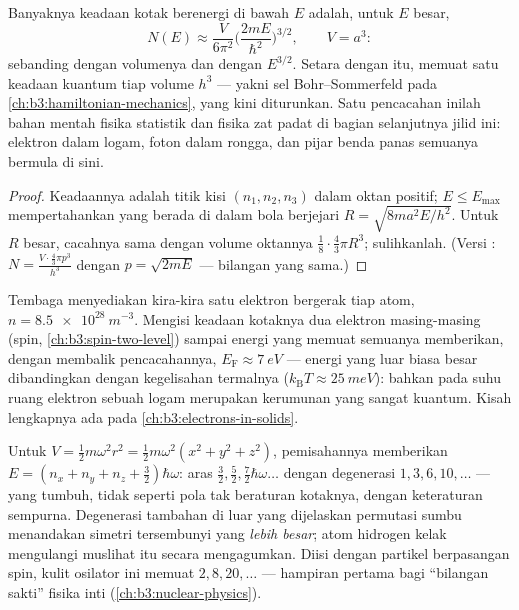 \begin{proposition}\label{prop:b3:schrodinger-three-dimensions:counting}
Banyaknya keadaan kotak berenergi di bawah $E$ adalah, untuk $E$ besar,
\[
N(E) \approx \frac{V}{6\pi^2}\Big(\frac{2mE}{\hbar^2}\Big)^{3/2} ,
\qquad V = a^3 :
\]
sebanding dengan volumenya dan dengan $E^{3/2}$. Setara dengan itu,
 memuat satu keadaan kuantum tiap volume $h^3$ --- yakni sel
Bohr--Sommerfeld pada
\cref{ch:b3:hamiltonian-mechanics}, yang kini diturunkan. Satu
pencacahan inilah bahan mentah fisika statistik dan fisika zat padat di
bagian selanjutnya jilid ini: elektron dalam logam, foton dalam rongga,
dan pijar benda panas semuanya bermula di sini.
\end{proposition}

\begin{proof}
Keadaannya adalah titik kisi $(n_1, n_2, n_3)$ dalam oktan positif;
$E \le E_{\max}$ mempertahankan yang berada di dalam bola berjejari $R =
\sqrt{8ma^2E/h^2}$. Untuk $R$ besar, cacahnya sama dengan volume
oktannya $\tfrac18\cdot\tfrac43\pi R^3$; sulihkanlah. (Versi : $N = \tfrac{V\cdot\frac43\pi p^3}{h^3}$ dengan $p = \sqrt{2mE}$ ---
bilangan yang sama.)
\end{proof}

\begin{example}\label{ex:b3:schrodinger-three-dimensions:metal}
Tembaga menyediakan kira-kira satu elektron bergerak tiap atom, $n =
\qty{8.5e28}{m^{-3}}$. Mengisi keadaan kotaknya dua elektron masing-masing
(spin, \cref{ch:b3:spin-two-level}) sampai energi yang memuat semuanya
memberikan, dengan membalik pencacahannya, $E_{\text{F}}
\approx \qty{7}{eV}$ --- energi yang luar biasa besar dibandingkan
dengan kegelisahan termalnya ($k_{\text{B}}T \approx \qty{25}{meV}$):
bahkan pada suhu ruang elektron sebuah logam merupakan kerumunan yang
sangat kuantum. Kisah lengkapnya ada pada
\cref{ch:b3:electrons-in-solids}.
\end{example}

\begin{example}\label{ex:b3:schrodinger-three-dimensions:oscillator}
Untuk $V = \tfrac12 m\omega^2r^2 = \tfrac12 m\omega^2(x^2 + y^2 +
z^2)$, pemisahannya memberikan $E = (n_x + n_y + n_z + \tfrac32)\hbar\omega$:
aras $\tfrac32, \tfrac52, \tfrac72\hbar\omega\ldots$ dengan
degenerasi $1, 3, 6, 10, \dots$ --- yang tumbuh, tidak seperti pola tak
beraturan kotaknya, dengan keteraturan sempurna. Degenerasi tambahan di
luar yang dijelaskan permutasi sumbu menandakan simetri tersembunyi yang
\emph{lebih besar}; atom hidrogen kelak mengulangi muslihat itu secara
mengagumkan. Diisi dengan partikel berpasangan spin, kulit osilator ini
memuat $2,
8, 20, \dots$ --- hampiran pertama bagi ``bilangan sakti'' fisika inti
(\cref{ch:b3:nuclear-physics}).
\end{example}

